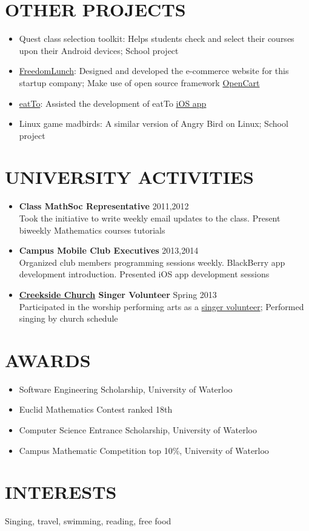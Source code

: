 \begin{resume}
\section{\uppercase{Other Projects}}
\begin{itemize}
\item Quest class selection toolkit: Helps students check and select their courses upon their Android devices; School project
\item \href{http://www.freedomlunch.ca/most-popular}{FreedomLunch}: Designed and developed the e-commerce website for this startup company; Make use of open source framework \href{http://www.opencart.com/}{OpenCart}
\item \href{http://www.eatto.ca/}{eatTo}: Assisted the development of eatTo \href{https://itunes.apple.com/us/app/yi-tong-mei-shi-huang-ye/id551261942?ls=1&mt=8}{iOS app}
\item Linux game madbirds: A similar version of Angry Bird on Linux; School project
\end{itemize}

\section{\uppercase{University Activities}}
\begin{itemize}
\item {\bf Class MathSoc Representative} \hfill 2011,2012 \\
Took the initiative to write weekly email updates to the class. Present biweekly Mathematics courses tutorials
\item {\bf Campus Mobile Club Executives} \hfill 2013,2014 \\
Organized club members programming sessions weekly. BlackBerry app development introduction. Presented iOS app development sessions
\item {\bf \href{http://www.creeksidechurch.ca/index.php}{Creekside Church} Singer Volunteer} \hfill Spring 2013 \\
Participated in the worship performing arts as a \href{http://www.creeksidechurch.ca/volunteer.php}{singer volunteer}; Performed singing by church schedule
\end{itemize}

\section{\uppercase{Awards}}
\begin{itemize}
\item Software Engineering Scholarship, University of Waterloo
\item Euclid Mathematics Contest ranked 18th
\item Computer Science Entrance Scholarship, University of Waterloo
\item Campus Mathematic Competition top 10\%, University of Waterloo
\end{itemize}

\section{\uppercase{Interests}}
Singing, travel, swimming, reading, free food

\end{resume} 
 



